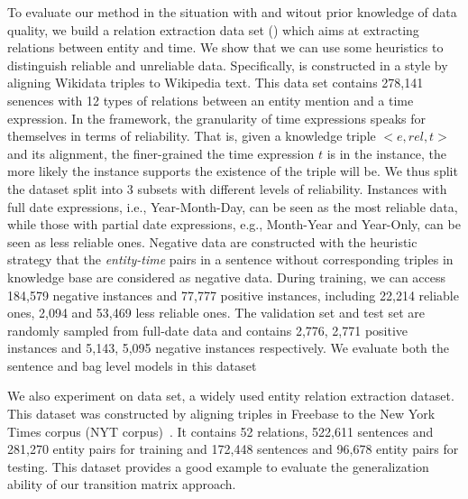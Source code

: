 To evaluate our method in the situation with and witout prior knowledge of data quality,
we build a relation extraction data set (\TimeRE) which aims at extracting relations between entity and time.
We show that we can use some heuristics to distinguish reliable and unreliable data.
Specifically, \TimeRE is constructed in a \DS style by aligning Wikidata triples to
Wikipedia text. This data set contains 278,141 senences with 12
types of relations  between an entity mention and a time expression. In the
\DS framework, the granularity of time expressions speaks for themselves in
terms of reliability. That is, given a knowledge triple $<e, rel, t>$ and its
alignment,  the  finer-grained the time expression $t$ is in the instance,
the more likely the instance  supports the existence of the triple will be.
We thus split the dataset split into
3 subsets with different levels of reliability.  Instances with full date expressions, i.e.,
Year-Month-Day, can be seen as the most reliable data, while those with
partial date expressions, e.g., Month-Year and Year-Only, can be seen as less
reliable ones.  Negative data are constructed with the heuristic strategy that the
\emph{entity-time} pairs in a sentence without corresponding triples in knowledge base are considered as negative data. 
During training, we can access  184,579 negative
instances and  77,777 positive instances, including 22,214 reliable
ones, 2,094 and 53,469 less reliable ones. The validation set and test set are randomly sampled from full-date data and contains
2,776, 2,771 positive instances and 5,143, 5,095 negative instances respectively. 
We evaluate both the sentence and bag level models in this dataset

We also experiment on \EntityRE data set, a widely used entity
relation extraction dataset. This dataset was constructed by aligning triples
in Freebase to the New York Times corpus (NYT
corpus)~\cite{riedel2010modeling}. It contains 52 relations, 522,611 sentences and 281,270
entity pairs for training and  172,448 sentences and 96,678 entity pairs for
testing. This dataset provides a good example to evaluate the generalization
ability of our transition matrix approach. 


